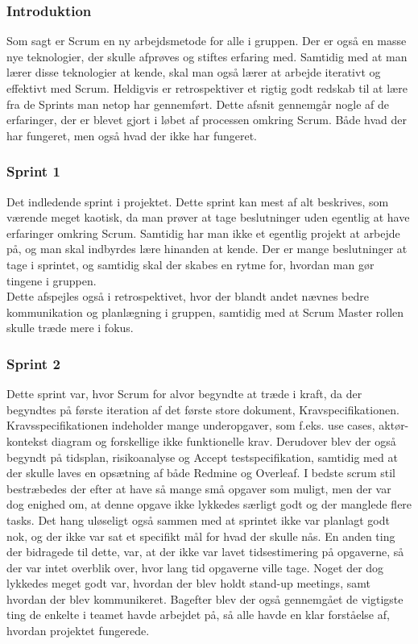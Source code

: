 \documentclass[a4paper,12pt,fleqn,oneside]{article}
\begin{document}
\subsubsection{Introduktion}
Som sagt er Scrum en ny arbejdsmetode for alle i gruppen. Der er også en masse nye teknologier, der skulle afprøves og stiftes erfaring med. Samtidig med at man lærer disse teknologier at kende, skal man også lærer at arbejde iterativt og effektivt med Scrum. Heldigvis er retrospektiver et rigtig godt redskab til at lære fra de Sprints man netop har gennemført. Dette afsnit gennemgår nogle af de erfaringer, der er blevet gjort i løbet af processen omkring Scrum. Både hvad der har fungeret, men også hvad der ikke har fungeret.

\subsubsection{Sprint 1}
Det indledende sprint i projektet. Dette sprint kan mest af alt beskrives, som værende meget kaotisk, da man prøver at tage beslutninger uden egentlig at have erfaringer omkring Scrum. Samtidig har man ikke et egentlig projekt at arbejde på, og man skal indbyrdes lære hinanden at kende. Der er mange beslutninger at tage i sprintet, og samtidig skal der skabes en rytme for, hvordan man gør tingene i gruppen. 
\\Dette afspejles også i retrospektivet, hvor der blandt andet nævnes bedre kommunikation og planlægning i gruppen, samtidig med at Scrum Master rollen skulle træde mere i fokus. 

\subsubsection{Sprint 2}
Dette sprint var, hvor Scrum for alvor begyndte at træde i kraft, da der begyndtes på første iteration af det første store dokument, Kravspecifikationen. Kravsspecifikationen indeholder mange underopgaver, som f.eks. use cases, aktør-kontekst diagram og forskellige ikke funktionelle krav. Derudover blev der også begyndt på tidsplan, risikoanalyse og Accept testspecifikation, samtidig med at der skulle laves en opsætning af både Redmine og Overleaf. I bedste scrum stil bestræbedes der efter at have så mange små opgaver som muligt, men der var dog enighed om, at denne opgave ikke lykkedes særligt godt og der manglede flere tasks. Det hang uløseligt også sammen med at sprintet ikke var planlagt godt nok, og der ikke var sat et specifikt mål for hvad der skulle nås. En anden ting der bidragede til dette, var, at der ikke var lavet tidsestimering på opgaverne, så der var intet overblik over, hvor lang tid opgaverne ville tage. Noget der dog lykkedes meget godt var, hvordan der blev holdt stand-up meetings, samt hvordan der blev kommunikeret. Bagefter blev der også gennemgået de vigtigste ting de enkelte i teamet havde arbejdet på, så alle havde en klar forståelse af, hvordan projektet fungerede. 
\end{document}
